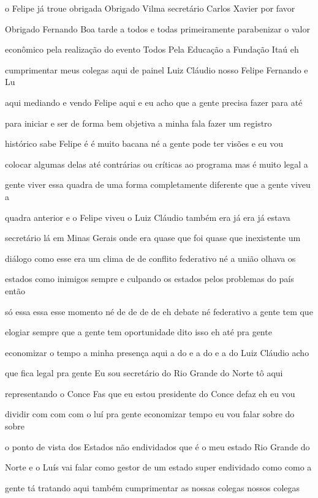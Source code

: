 \documentclass[a4paper,12pt]{article}
\begin{document}
o Felipe já troue obrigada Obrigado Vilma secretário Carlos Xavier por favor

Obrigado Fernando Boa tarde a todos e todas primeiramente parabenizar o valor

econômico pela realização do evento Todos Pela Educação a Fundação Itaú eh

cumprimentar meus colegas aqui de painel Luiz Cláudio nosso Felipe Fernando e Lu

aqui mediando e vendo Felipe aqui e eu acho que a gente precisa fazer para até

para iniciar e ser de forma bem objetiva a minha fala fazer um registro

histórico sabe Felipe é é muito bacana né a gente pode ter visões e eu vou

colocar algumas delas até contrárias ou críticas ao programa mas é muito legal a

gente viver essa quadra de uma forma completamente diferente que a gente viveu a

quadra anterior e o Felipe viveu o Luiz Cláudio também era já era já estava

secretário lá em Minas Gerais onde era quase que foi quase que inexistente um

diálogo como esse era um clima de de conflito federativo né a união olhava os

estados como inimigos sempre e culpando os estados pelos problemas do país então

só essa essa esse momento né de de de de eh debate né federativo a gente tem que

elogiar sempre que a gente tem oportunidade dito isso eh até pra gente

economizar o tempo a minha presença aqui a do e a do e a do Luiz Cláudio acho

que fica legal pra gente Eu sou secretário do Rio Grande do Norte tô aqui

representando o Conce Fas que eu estou presidente do Conce defaz eh eu vou

dividir com com com o luí pra gente economizar tempo eu vou falar sobre do sobre

o ponto de vista dos Estados não endividados que é o meu estado Rio Grande do

Norte e o Luís vai falar como gestor de um estado super endividado como como a

gente tá tratando aqui também cumprimentar as nossas colegas nossos colegas
\end{document}
